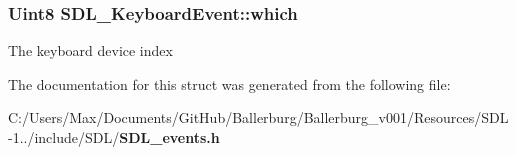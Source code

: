 \subsubsection[{which}]{\setlength{\rightskip}{0pt plus 5cm}Uint8 S\+D\+L\+\_\+\+Keyboard\+Event\+::which}\label{struct_s_d_l___keyboard_event_acb25972bab6a9f142de5652530857b9b}
The keyboard device index 

The documentation for this struct was generated from the following file\+:\begin{DoxyCompactItemize}
\item 
C\+:/\+Users/\+Max/\+Documents/\+Git\+Hub/\+Ballerburg/\+Ballerburg\+\_\+v001/\+Resources/\+S\+D\+L-\/1../include/\+S\+D\+L/{\bf S\+D\+L\+\_\+events.\+h}\end{DoxyCompactItemize}
